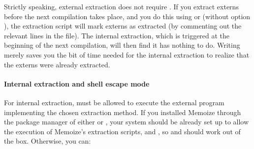 \documentclass[a4paper,11pt]{article}
\begin{document}
Strictly speaking, external extraction does not require
.  If you extract externs before the
next compilation takes place, and you do this using
 or  (without
option ), the extraction script will mark
externs as extracted (by commenting out the relevant lines in the \dmmz file).
The internal extraction, which is triggered at the beginning of the next
compilation, will then find it has nothing to do.  Writing
 merely saves you the bit of time
needed for the internal extraction to realize that the externs were already
extracted.

\paragraph{Internal extraction and shell escape mode}

For internal extraction,  must be allowed to execute the external
program implementing the chosen extraction method.  If you installed Memoize
through the package manager of either \TeXLive or \MiKTeX, your system should
be already set up to allow the execution of Memoize's extraction scripts,
 and , so
 and
 should work out of the box.
Otherwise, you can:
\end{document}
